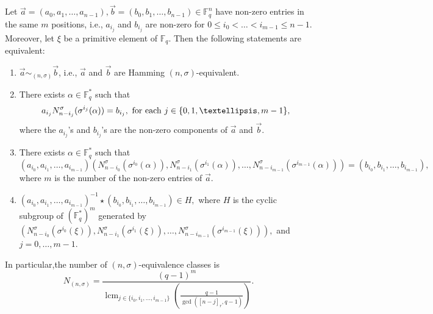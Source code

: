 \documentclass[10pt,a4paper]{amsart}
\DeclareMathOperator{\lcm}{lcm}
\newcommand{\Fq}{\mathbb{F}_{q}}
\begin{document}
\begin{theorem}\label{Th_general}
Let $ \vec{a}=(a_0,a_1,\ldots, a_{n-1}), \vec{b}=(b_0,b_1,\ldots, b_{n-1})\in \mathbb{F}_q^{n}$ have non-zero entries in the same $m$ positions, i.e., $a_{i_j}$ and $b_{i_j}$ are non-zero  for $0\leq i_0<\dots<i_{m-1}\leq n-1$. Moreover, let $\xi $ be a primitive element of $\Fq$. Then the following statements are equivalent:
\begin{enumerate}
\item $ \vec{a} \sim_{(n,\sigma)} \vec{b}$,  i.e., $ \vec{a} $ and  $ \vec{b}$ are  Hamming $ (n,\sigma)$-equivalent. 

\item   There exists $\alpha\in \Fq^*$ such that 
 $$  a_{i_j} N^{\sigma}_{n-i_j}(\sigma^{i_j}(\alpha)) = b_{i_j}, \   \text{for  each $ j \in \{0,1,\ldots,m-1\}$,}$$   where the  $ a_{i_j}$'s and $  b_{i_j}$'s are the non-zero components of $\vec{a}$ and $\vec{b}.$
 
 \item  There exists $\alpha\in \Fq^*$ such that 
 $$ (a_{i_0}, a_{i_1},\ldots, a_{i_{m-1}}) \left( N^{\sigma}_{n-i_0}(\sigma^{i_0}(\alpha)), N^{\sigma}_{n-i_1}(\sigma^{i_1}(\alpha)) , \ldots, N^{\sigma}_{n-i_{m-1}}(\sigma^{i_{m-1}}(\alpha))\right)=  ( b_{i_0}, b_{i_1},\ldots, b_{i_{m-1}}),$$
 where $m$ is the number of the non-zero entries  of $\vec{a}.$
\item $ (a_{i_0}, a_{i_1},\ldots, a_{i_{m-1}})^{-1}\star ( b_{i_0}, b_{i_1},\ldots, b_{i_{m-1}}) \in H,$ where $H$ is the cyclic subgroup of $ (\Fq^*)^m$ generated by 
$  \left( N^{\sigma}_{n-i_0}(\sigma^{i_0}(\xi)), N^{\sigma}_{n-i_1}(\sigma^{i_1}(\xi)) , \ldots, N^{\sigma}_{n-i_{m-1}}(\sigma^{i_{m-1}}(\xi))\right),$  and   $j=0,\ldots,m-1.$
\end{enumerate}
In particular,the number of $(n,\sigma)$-equivalence classes is
$$ N_{(n,\sigma)}=\dfrac{ (q-1)^m}{ \lcm_{ j\in \{i_0,i_1,\ldots, i_{m-1} \} }\left(\frac{q-1}{ \gcd([n-j]_r,q-1)}\right)}. $$
\end{theorem}
\end{document}
